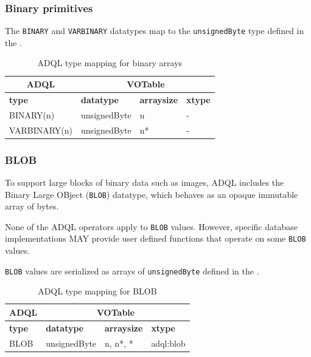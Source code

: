 \documentclass[11pt,a4paper]{ivoa}
\begin{document}
\subsubsection{Binary primitives}
\label{sec:types.binary.primitive}

The \verb:BINARY: and \verb:VARBINARY: datatypes map to the \verb:unsignedByte:
type defined in the \VOTableSpec{}.

\begin{table}[h]\footnotesize
    \begin{tabular}
        {|p{}|p{}|p{}|p{}|}

        \hline
        \multicolumn{1}{|c|}{\textbf{ADQL}} &
        \multicolumn{3}{|c|}{\textbf{VOTable}}
        \tabularnewline

        \hline
        \textbf{type} &
        \textbf{datatype} &
        \textbf{arraysize} &
        \textbf{xtype}
        \tabularnewline

        \hline
        BINARY(n) &
        unsignedByte &
        n &
        -
        \tabularnewline

        \hline
        VARBINARY(n) &
        unsignedByte &
        n* &
        -
        \tabularnewline
        \hline
    \end{tabular}
    \caption{ADQL type mapping for binary arrays}
    \label{table:types.binary.primitive}
\end{table}

\subsubsection{BLOB}
\label{sec:types.binary.blob}

To support large blocks of binary data such as images,
ADQL includes the Binary Large OBject (\verb:BLOB:) datatype,
which behaves as an opaque immutable array of bytes.

None of the ADQL operators apply to \verb:BLOB: values.
However, specific database implementations MAY provide user
defined functions that operate on some \verb:BLOB: values.

\verb:BLOB: values are serialized as arrays of \verb:unsignedByte: defined
in the \VOTableSpec{}.

\begin{table}[h]\footnotesize
    \begin{tabular}
        {|p{}|p{}|p{}|p{}|}

        \hline
        \multicolumn{1}{|c|}{\textbf{ADQL}} &
        \multicolumn{3}{|c|}{\textbf{VOTable}}
        \tabularnewline

        \hline
        \textbf{type} &
        \textbf{datatype} &
        \textbf{arraysize} &
        \textbf{xtype}
        \tabularnewline

        \hline
        BLOB &
        unsignedByte  &
        n, n*, * &
        adql:blob
        \tabularnewline
        \hline
    \end{tabular}
    \caption{ADQL type mapping for BLOB}
    \label{table:types.binary.blob}
\end{table}
\end{document}

